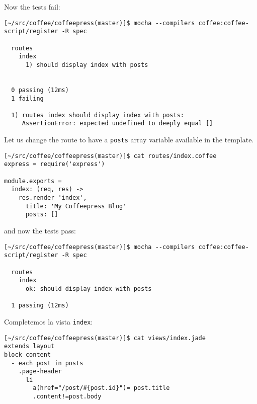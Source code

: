 Now the tests fail:

\begin{verbatim}
[~/src/coffee/coffeepress(master)]$ mocha --compilers coffee:coffee-script/register -R spec

  routes
    index
      1) should display index with posts


  0 passing (12ms)
  1 failing

  1) routes index should display index with posts:
     AssertionError: expected undefined to deeply equal []
\end{verbatim}

Let us change the route to have a \verb|posts| 
array variable available in the template.
\begin{verbatim}
[~/src/coffee/coffeepress(master)]$ cat routes/index.coffee 
express = require('express')

module.exports = 
  index: (req, res) ->
    res.render 'index', 
      title: 'My Coffeepress Blog' 
      posts: []
\end{verbatim}
and now the tests pass:
\begin{verbatim}
[~/src/coffee/coffeepress(master)]$ mocha --compilers coffee:coffee-script/register -R spec

  routes
    index
      ok: should display index with posts 

  1 passing (12ms)
\end{verbatim}


Completemos la vista \verb|index|:
\begin{verbatim}
[~/src/coffee/coffeepress(master)]$ cat views/index.jade 
extends layout
block content
  - each post in posts
    .page-header
      li
        a(href="/post/#{post.id}")= post.title
        .content!=post.body
\end{verbatim}



